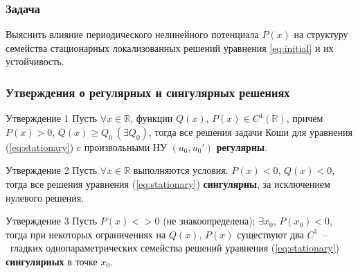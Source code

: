 \documentclass{beamer}
\begin{document}
\begin{frame}
	\frametitle{Задача}
	
	Выяснить влияние периодического нелинейного потенциала $P(x)$ на структуру семейства стационарных локализованных решений уравнения \eqref{eq:initial} и их устойчивость.
	
\end{frame}

\begin{frame}
	\frametitle{Утверждения о регулярных и сингулярных решениях}

	\begin{block}{Утверждение 1}
		Пусть $\forall x \in \mathbb{R}$, функции $Q(x)$, $P(x) \in C^1(\mathbb{R})$, причем $P(x) > 0$, $Q(x) \ge Q_0~(\exists Q_0)$, тогда все решения задачи Коши для уравнения (\ref{eq:stationary}) c произвольными НУ $(u_0, u_0')$ {\bf регулярны}\footnotemark[2]. 
	\end{block}

	\begin{block}{Утверждение 2}
		Пусть $\forall x \in \mathbb{R}$ выполняются условия: $P(x) < 0$, $Q(x) < 0$, тогда все решения уравнения (\ref{eq:stationary}) {\bf сингулярны}, за исключением нулевого решения\footnotemark[2].
	\end{block}

	\begin{block}{Утверждение 3}
		Пусть $P(x) <> 0$ (не знакоопределена); $\exists x_0$, $P(x_0) < 0$, тогда при некоторых ограничениях на $Q(x)$, $P(x)$ существуют два $C^1$~--~гладких однопараметрических семейства решений уравнения (\ref{eq:stationary}) {\bf сингулярных} в точке $x_0$\footnotemark[2].
	\end{block}

\end{frame}

\end{document}
